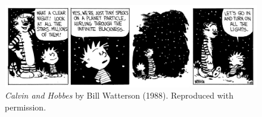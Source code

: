 
\newpage
\thispagestyle{plain}




\begin{figure}
	\centering
	\includegraphics[width=\textwidth]{Figures/calvin_2}
    \caption*{\centering \textit{Calvin and Hobbes} by Bill Watterson (1988). Reproduced with permission.} 
\end{figure}